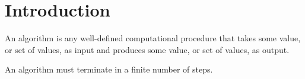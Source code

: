 \section{Introduction}

\begin{definition}
    An algorithm is any well-defined computational procedure that takes some value, or set of values, as input and produces some value, or set of values, as output.
\end{definition}
An algorithm must terminate in a finite number of steps. 